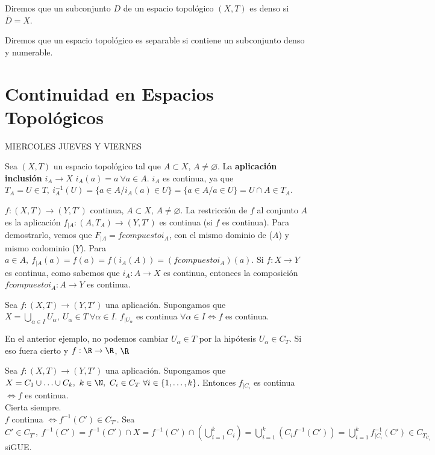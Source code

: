 \begin{ndef}
  Diremos que un subconjunto $D$ de un espacio topológico $(X,T)$ es denso si $\overline{D}=X$.
\end{ndef}

\begin{ndef}[Separable]
  Diremos que un espacio topológico es separable si contiene un subconjunto denso y numerable.
\end{ndef}


\newpage
\section{Continuidad en Espacios Topológicos}
MIERCOLES JUEVES Y VIERNES
\begin{exmp}
  Sea $(X,T)$ un espacio topológico tal que $A \subset X$, $A \neq \varnothing$. La \textbf{aplicación inclusión} $i_A \to X$ $i_A(a)=a \ \forall a \in A$. $i_A$ es continua, ya que $T_A=U \in T,\ i^{-1}_A(U)=\{a \in A / i_A(a) \in U\}=\{a \in A / a \in U\}=U \cap A \in T_A$.
\end{exmp}

\begin{exmp}
  $f:(X,T) \to (Y,T')$ continua, $A \subset X$, $A \neq \varnothing$. La restricción de $f$ al conjunto $A$ es la aplicación $f_{|A}: (A,T_A) \to(Y,T')$ es continua (si $f$ es continua). Para demostrarlo, vemos que $F_{|A} = f compuesto i_A$, con el mismo dominio de ($A$) y mismo codominio ($Y$). Para $a \in A, \ f_{|A}(a)=f(a)=f(i_A(A))=(f compuesto i_A)(a)$. Si $f:X \to Y$ es continua, como sabemos que $i_A:A \to X$ es continua, entonces la composición $f compuesto i_A:A \to Y$ es continua.
\end{exmp}

\begin{exmp}
  Sea $f: (X,T) \to (Y,T')$ una aplicación. Supongamos que $X = \bigcup_{\alpha \in I}U_{\alpha},\ U_{\alpha} \in T \ \forall \alpha \in I$. $f_{|U_{\alpha}}$ es continua $\forall \alpha \in I \Leftrightarrow f$ es continua.
\end{exmp}
En el anterior ejemplo, no podemos cambiar $U_{\alpha} \in T$ por la hipótesis $U_{\alpha} \in C_T$. Si eso fuera cierto y $f: \R \to \R$, $\R$

\begin{exmp}
  Sea $f:(X,T) \to (Y,T')$ una aplicación. Supongamos que $X=C_1 \cup \ldots \cup C_k,\ k \in \N,\ C_i \in C_T \ \forall i \in \{1,\ldots,k\}$. Entonces $f_{|C_i}$ es continua $\Leftrightarrow f$ es continua. \\
  \fbox{$\Leftarrow$} Cierta siempre. \\
  \fbox{$\Rightarrow$} $f$ continua $\Leftrightarrow f^{-1}(C') \in C_{T'}$. Sea $C' \in C_{T'},\ f^{-1}(C')=f^{-1}(C') \cap X = f^{-1}(C') \cap (\bigcup^k_{i=1}C_i)=\bigcup^k_{i=1} (C_if^{-1}(C')) = \bigcup_{i=1}^kf^{-1}_{|C_i}(C') \in C_{T_{C_i}}$ siGUE.
\end{exmp}



